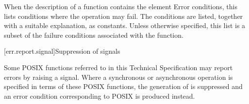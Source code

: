 \pnum
When the description of a function contains the element Error conditions, this lists conditions where the operation may fail. The conditions are listed, together with a suitable explanation, as  constants. Unless otherwise specified, this list is a subset of the failure conditions associated with the function.



[err.report.signal]{Suppression of signals}

\pnum
Some POSIX functions referred to in this Technical Specification may report errors by raising a  signal. Where a synchronous or asynchronous operation is specified in terms of these POSIX functions, the generation of  is suppressed and an error condition corresponding to POSIX  is produced instead.



